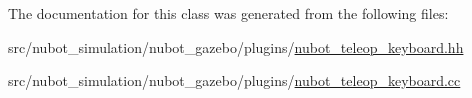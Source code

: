 The documentation for this class was generated from the following files\-:\begin{DoxyCompactItemize}
\item 
src/nubot\-\_\-simulation/nubot\-\_\-gazebo/plugins/\hyperlink{nubot__teleop__keyboard_8hh}{nubot\-\_\-teleop\-\_\-keyboard.\-hh}\item 
src/nubot\-\_\-simulation/nubot\-\_\-gazebo/plugins/\hyperlink{nubot__teleop__keyboard_8cc}{nubot\-\_\-teleop\-\_\-keyboard.\-cc}\end{DoxyCompactItemize}
